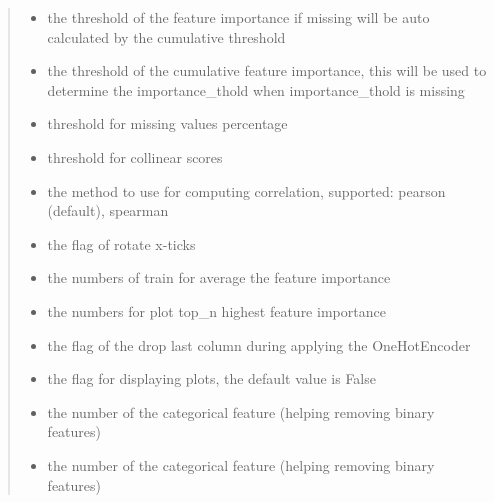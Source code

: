\documentclass[letterpaper,11pt,english]{sphinxmanual}
\begin{document}
\begin{fulllineitems}
\begin{fulllineitems}
\begin{quote}
\begin{description}
\begin{itemize}
\item {} 
 \textendash{} the threshold of the feature importance if missing will be auto calculated by the
cumulative threshold

\item {} 
 \textendash{} the threshold of the cumulative feature importance, this will be used to determine
the importance\_thold when importance\_thold is missing

\item {} 
 \textendash{} threshold for missing values percentage

\item {} 
 \textendash{} threshold for collinear scores

\item {} 
 \textendash{} the method to use for computing correlation, supported: pearson (default), spearman

\item {} 
 \textendash{} the flag of rotate x-ticks

\item {} 
 \textendash{} the numbers of train for average the feature importance

\item {} 
 \textendash{} the numbers for plot top\_n highest feature importance

\item {} 
 \textendash{} the flag of the drop last column during applying the OneHotEncoder

\item {} 
 \textendash{} the flag for displaying plots, the default value is False

\item {} 
 \textendash{} the number of the categorical feature (helping removing binary features)

\item {} 
 \textendash{} the number of the categorical feature (helping removing binary features)


\end{itemize}
\end{description}
\end{quote}
\end{fulllineitems}
\end{fulllineitems}
\end{document}

